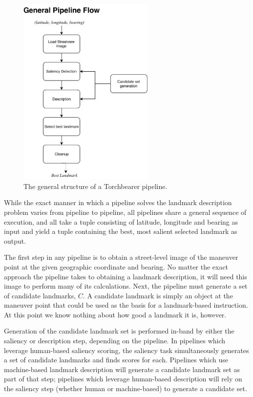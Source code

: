 \begin{figure}[htbp]
  \centering
  \includegraphics[width=0.6\textwidth]{pipeline_diagrams/general.pdf}
  \caption{The general structure of a Torchbearer pipeline.}
  \label{fig:pipeline:overview}
\end{figure}

While the exact manner in which a pipeline solves the landmark description problem varies from pipeline to pipeline, all pipelines share a general sequence of execution, and all take a tuple consisting of latitude, longitude and bearing as input and yield a tuple containing the best, most salient selected landmark as output.

The first step in any pipeline is to obtain a street-level image of the maneuver point at the given geographic coordinate and bearing. No matter the exact approach the pipeline takes to obtaining a landmark description, it will need this image to perform many of its calculations. Next, the pipeline must generate a set of candidate landmarks, $C$. A candidate landmark is simply an object at the maneuver point that could be used as the basis for a landmark-based instruction. At this point we know nothing about how good a landmark it is, however. 
	
Generation of the candidate landmark set is performed in-band by either the saliency or description step, depending on the pipeline. In pipelines which leverage human-based saliency scoring, the saliency task simultaneously generates a set of candidate landmarks and finds scores for each. Pipelines which use machine-based landmark description will generate a candidate landmark set as part of that step; pipelines which leverage human-based description will rely on the saliency step (whether human or machine-based) to generate a candidate set. 

